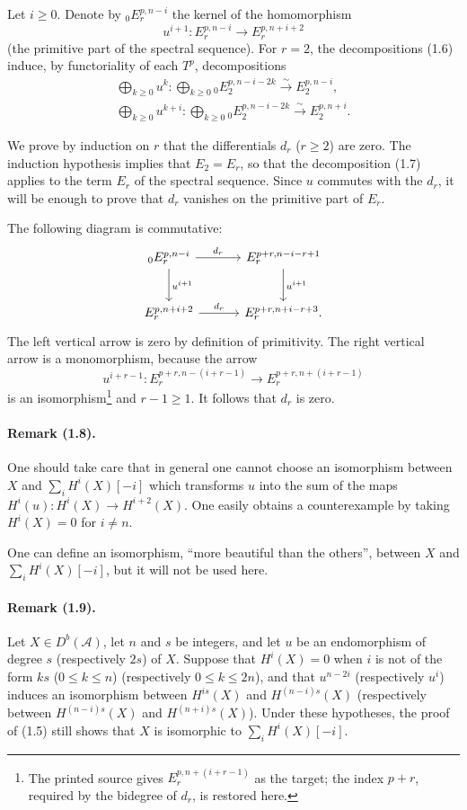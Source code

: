 \documentclass[10pt]{article}
\newcommand{\Acal}{\mathcal A}
\newcommand{\Db}{D^b}
\newcommand{\iso}{\xrightarrow{\sim}}
\begin{document}
Let $i\ge0$. Denote by ${}_0E_r^{p,n-i}$ the kernel of the homomorphism
\[
u^{i+1}:E_r^{p,n-i}\longrightarrow E_r^{p,n+i+2}
\]
(the primitive part of the spectral sequence). For $r=2$, the decompositions (1.6) induce, by functoriality of each $T^p$, decompositions
\[
\tag{1.7}
\begin{gathered}
\bigoplus_{k\ge0}u^k:\bigoplus_{k\ge0}{}_0E_2^{p,n-i-2k}\iso E_2^{p,n-i},\\
\bigoplus_{k\ge0}u^{k+i}:\bigoplus_{k\ge0}{}_0E_2^{p,n-i-2k}\iso E_2^{p,n+i}.
\end{gathered}
\]

We prove by induction on $r$ that the differentials $d_r$ ($r\ge2$) are zero. The induction hypothesis implies that $E_2=E_r$, so that the decomposition (1.7) applies to the term $E_r$ of the spectral sequence. Since $u$ commutes with the $d_r$, it will be enough to prove that $d_r$ vanishes on the primitive part of $E_r$.

The following diagram is commutative:
\[
\begin{tikzcd}[column sep=3.2em,row sep=2.6em]
{}_0E_r^{p,n-i} \arrow[r,"d_r"] \arrow[d,"u^{i+1}"] & E_r^{p+r,n-i-r+1} \arrow[d,"u^{i+1}"]\\
E_r^{p,n+i+2} \arrow[r,"d_r"] & E_r^{p+r,n+i-r+3}.
\end{tikzcd}
\]
The left vertical arrow is zero by definition of primitivity. The right vertical arrow is a monomorphism, because the arrow
\[
u^{i+r-1}:E_r^{p+r,n-(i+r-1)}\longrightarrow E_r^{p+r,n+(i+r-1)}
\]
is an isomorphism\footnote{The printed source gives $E_r^{p,n+(i+r-1)}$ as the target; the index $p+r$, required by the bidegree of $d_r$, is restored here.} and $r-1\ge1$. It follows that $d_r$ is zero.

\paragraph{Remark (1.8).} One should take care that in general one cannot choose an isomorphism between $X$ and $\sum_iH^i(X)[-i]$ which transforms $u$ into the sum of the maps $H^i(u):H^i(X)\to H^{i+2}(X)$. One easily obtains a counterexample by taking $H^i(X)=0$ for $i\ne n$.

One can define an isomorphism, ``more beautiful than the others'', between $X$ and $\sum_iH^i(X)[-i]$, but it will not be used here.

\paragraph{Remark (1.9).} Let $X\in\Db(\Acal)$, let $n$ and $s$ be integers, and let $u$ be an endomorphism of degree $s$ (respectively $2s$) of $X$. Suppose that $H^i(X)=0$ when $i$ is not of the form $ks$ ($0\le k\le n$) (respectively $0\le k\le2n$), and that $u^{n-2i}$ (respectively $u^i$) induces an isomorphism between $H^{is}(X)$ and $H^{(n-i)s}(X)$ (respectively between $H^{(n-i)s}(X)$ and $H^{(n+i)s}(X)$). Under these hypotheses, the proof of (1.5) still shows that $X$ is isomorphic to $\sum_iH^i(X)[-i]$.
\end{document}
